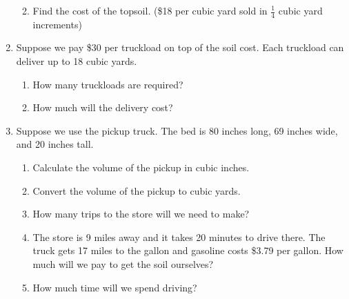 \begin{exercise}
\begin{enumerate}
\begin{enumerate}

    \item Find the cost of the topsoil. (\$18 per cubic yard sold in
      \(\tfrac{1}{4}\) cubic yard increments)

    \end{enumerate}

  \item Suppose we pay \$30 per truckload on top of the soil cost.
    Each truckload can deliver up to 18 cubic yards.
    \begin{enumerate}
    \item How many truckloads are required?


    \item How much will the delivery cost?


    \end{enumerate}

    \newpage

  \item Suppose we use the pickup truck. The bed is 80 inches long, 69
    inches wide, and 20 inches tall.
    \begin{enumerate}
    \item Calculate the volume of the pickup in cubic inches.


    \item Convert the volume of the pickup to cubic yards.


    \item How many trips to the store will we need to make?


    \item The store is 9 miles away and it takes 20 minutes to drive
      there. The truck gets 17 miles to the gallon and gasoline costs
      \$3.79 per gallon. How much will we pay to get the soil
      ourselves?


    \item How much time will we spend driving?
    \end{enumerate}


  \end{enumerate}
\end{exercise}



